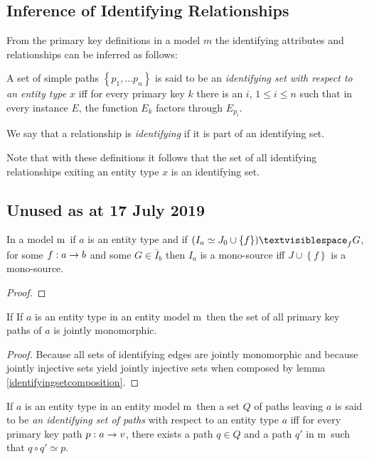 \documentclass[10pt,a4paper]{article}
\newcommand{\commentary}[1]{\marginpar{\footnotesize #1}}
\newcommand{\set}[1]{\left\{#1\right\}}
\newcommand{\genericmodel}{\mathcal{M}}
\renewcommand{\genericmodel}{{m}}
\newcommand{\term}[1]{\textit{{#1}}}
\begin{document}
\subsection*{Inference of Identifying Relationships}
From the primary key definitions in a model $\genericmodel$ the identifying attributes and relationships can be inferred as follows:

\begin{definition}
A set of simple paths $\set{p_1,...p_n}$ is said to be an 
\term{identifying set with respect to an entity type $x$} iff for every primary key $k$
 there is an $i$, $1 \leq i \leq n$ such that in every 
instance $E$, the function $E_k$ factors through $E_{p_i}$. 
\end{definition}
We say that a relationship is \textit{identifying} if it is part of an identifying set. 

Note that with these definitions it follows that the set of all identifying relationships exiting an entity type $x$ is an identifying set.

\subsection*{Unused as at 17 July 2019}

\begin{lemma}
In a model \genericmodel\ if $a$ is an entity type and if $(I_a \simeq J_0 \cup \set{f})\textvisiblespace_f G$,
for some $f: a \rightarrow b$ and some $G \in \bar{I}_b$ then 
$I_a$ is a mono-source iff $J \cup \set{f}$ is a mono-source.
\end{lemma}
\begin{proof}
\end{proof} 


\begin{lemma}
\label{primarykeypathsjointlymonomorphic}
If If $a$ is an entity type in an entity model \genericmodel\ then the set of all primary key paths 
of $a$ is jointly monomorphic.
\end{lemma}
\begin{proof}
Because all sets of identifying edges are jointly monomorphic and because jointly injective sets
yield jointly injective sets when composed by lemma \ref{identifyingsetcomposition}. \commentary{Do a better job of this proof.}
\end{proof}

\begin{definition}
If $a$ is an entity type in an entity model \genericmodel\ then a set $Q$ of paths 
leaving $a$ is said to be \term{an identifying set of paths} with respect 
to an entity type $a$ iff for every primary key path $p:a \rightarrow v$, there exists 
a path $q \in Q$ and a path $q'$ in \genericmodel\ such that $q \circ q' \simeq p$.
\end{definition}
\end{document}
